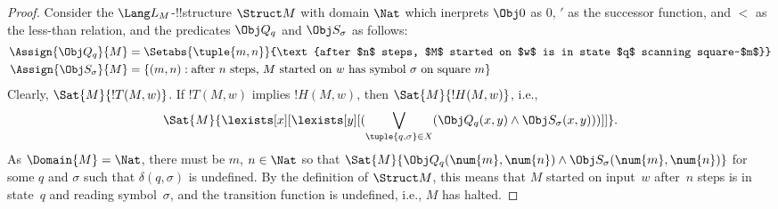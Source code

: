 \documentclass[../../../include/open-logic-section]{subfiles}
\begin{document}
\begin{proof} 
Consider the $\Lang L_M$-!!{structure} $\Struct M$ with
domain $\Nat$ which inerprets $\Obj 0$ as $0$, $'$ as the successor
function, and $<$ as the less-than relation, and the predicates $\Obj Q_q$
and $\Obj S_\sigma$ as follows:
\begin{align*}
  \Assign{\Obj Q_q}{M} & =
\Setabs{\tuple{m, n}}{\text{after $n$ steps, $M$ started on $w$ is in state $q$
  scanning square~$m$}} \\
\Assign{\Obj S_\sigma}{M} & = \{(m, n) :
\text{after $n$ steps, $M$ started on $w$ has symbol~$\sigma$ on
  square~$m$}\}
\end{align*}
Clearly, $\Sat{M}{!T(M, w)}$. If $!T(M, w)$
implies $!H(M, w)$, then $\Sat{M}{!H(M, w)}$, i.e.,
\[
\Sat{M}{\lexists[x][\lexists[y][(\bigvee_{\tuple{q, \sigma} \in
      X}(\Obj Q_q(x, y) \land \Obj S_\sigma(x, y)))]]}.
\]
As $\Domain{M} = \Nat$, there must be $m$, $n \in \Nat$ so that
$\Sat{M}{\Obj Q_q(\num{m}, \num{n}) \land \Obj S_\sigma(\num{m},
  \num{n})}$ for some $q$ and $\sigma$ such that $\delta(q, \sigma)$
is undefined. By the definition of $\Struct M$, this means that $M$
started on input~$w$ after~$n$ steps is in state~$q$ and reading
symbol~$\sigma$, and the transition function is undefined, i.e., $M$
has halted.
\end{proof}
\end{document}
